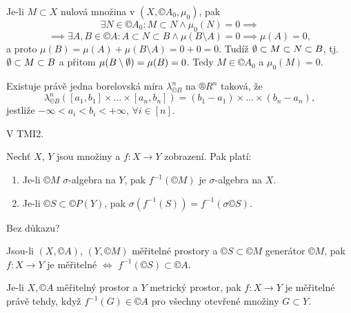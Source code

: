 \documentclass[12pt]{article}					%
\begin{document}
\begin{veta}
	\begin{dukazin}[3.]
		Je-li $M \subset X$ nulová množina v $(X, ©A_0, \mu_0)$, pak
		$$ \exists N \in ©A_0: M \subset N \land \mu_0(N) = 0 \implies $$
		$$ \implies \exists A, B \in ©A: A \subset N \subset B \land \mu(B \setminus A) = 0 \implies \mu(A) = 0, $$
		a proto $\mu(B) = \mu(A) + \mu(B \setminus A) = 0 + 0 = 0$. Tudíž $\emptyset \subset M \subset N \subset B$, tj. $\emptyset \subset M \subset B$ a přitom $\mu(B \setminus \emptyset) = \mu(B) = 0$. Tedy $M \in ©A_0$ a $\mu_0(M) = 0$.
	\end{dukazin}
\end{veta}

\begin{veta}
	Existuje právě jedna borelovská míra $\lambda_{©B}^n$ na $®R^n$ taková, že
	$$ \lambda_{©B}^n([a_1, b_1] \times … \times [a_n, b_n]) = (b_1 - a_1) \times … \times (b_n - a_n), $$
	jestliže $-∞ < a_i < b_i < + ∞$, $\forall i \in [n]$.

	\begin{dukazin}
		V TMI2.
	\end{dukazin}
\end{veta}


\begin{veta}
	Nechť $X$, $Y$ jsou množiny a $f: X \rightarrow Y$ zobrazení. Pak platí:

	\begin{enumerate}
		\item Je-li $©M$ $\sigma$-algebra na $Y$, pak $f^{-1}(©M)$ je $\sigma$-algebra na $X$.
		\item Je-li $©S \subset ©P(Y)$, pak $\sigma(f^{-1}(S)) = f^{-1}(\sigma ©S)$.
	\end{enumerate}

	\begin{dukazin}
		Bez důkazu?
	\end{dukazin}
\end{veta}

\begin{dusledek}
	Jsou-li $(X, ©A)$, $(Y, ©M)$ měřitelné prostory a $©S \subset ©M$ generátor $©M$, pak $f: X \rightarrow Y$ je měřitelné $\Leftrightarrow$ $f^{-1}(©S) \subset ©A$.
\end{dusledek}

\begin{dusledek}
	Je-li $X, ©A$ měřitelný prostor a $Y$ metrický prostor, pak $f: X \rightarrow Y$ je měřitelné právě tehdy, když $f^{-1}(G) \in ©A$ pro všechny otevřené množiny $G \subset Y$.
\end{dusledek}
\end{document}
